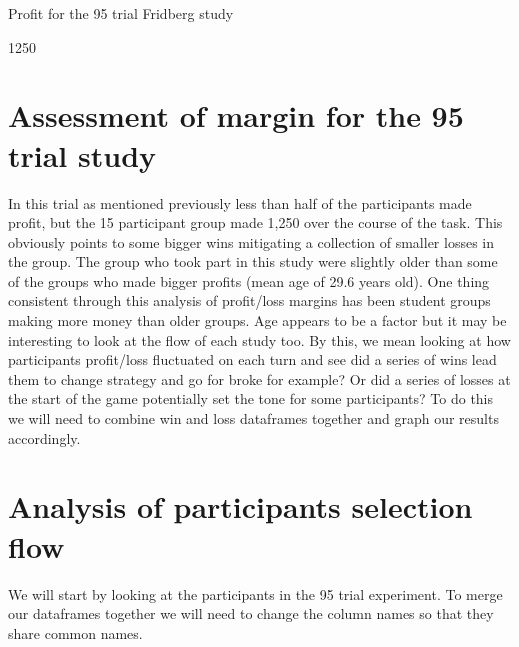 \documentclass[letterpaper,10pt,english]{jupyterBook}
\begin{document}
\begin{sphinxVerbatim}[commandchars=\\\{\}]
Profit for the 95 trial Fridberg study
\end{sphinxVerbatim}

\begin{sphinxVerbatim}[commandchars=\\\{\}]
1250
\end{sphinxVerbatim}


\section{Assessment of margin for the 95 trial study}
\label{\detokenize{data-analysis:assessment-of-margin-for-the-95-trial-study}}
\sphinxAtStartPar
In this trial as mentioned previously less than half of the participants made profit, but the 15 participant group made 1,250 over the course of the task. This obviously points to some bigger wins mitigating a collection of smaller losses in the group. The group who took part in this study were slightly older than some of the groups who made bigger profits (mean age of 29.6 years old). One thing consistent through this analysis of profit/loss margins has been student groups making more money than older groups. Age appears to be a factor but it may be interesting to look at the flow of each study too. By this, we mean looking at how participants profit/loss fluctuated on each turn and see did a series of wins lead them to change strategy and go for broke for example? Or did a series of losses at the start of the game potentially set the tone for some participants? To do this we will need to combine win and loss dataframes together and graph our results accordingly.


\section{Analysis of participants selection flow}
\label{\detokenize{data-analysis:analysis-of-participants-selection-flow}}
\sphinxAtStartPar
We will start by looking at the participants in the 95 trial experiment. To merge our dataframes together we will need to change the column names so that they share common names.

\begin{sphinxVerbatim}[commandchars=\\\{\}]
  \PYG{p}{[}    \PYG{p}{]}
  
   
\end{sphinxVerbatim}
\end{document}
